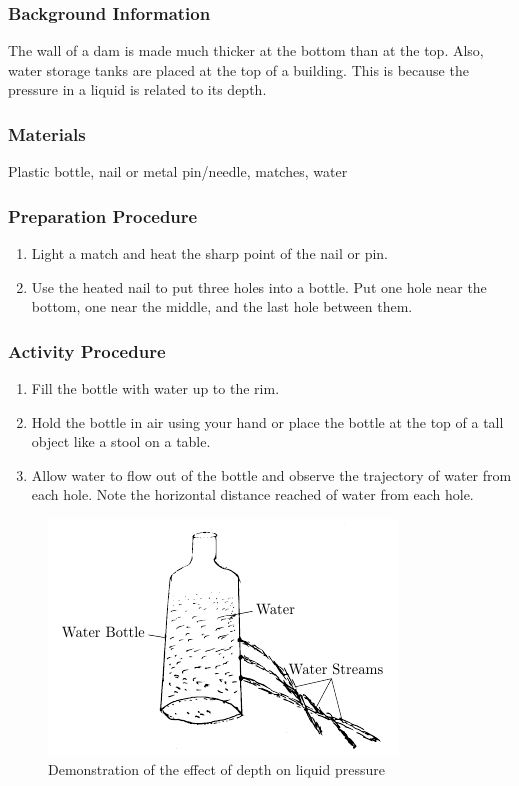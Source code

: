 \subsubsection*{Background Information}
The wall of a dam is made much thicker at the bottom than at the top. Also, water storage tanks are placed at the top of a building. This is because the pressure in a liquid is related to its depth.

\subsubsection*{Materials}
Plastic bottle, nail or metal pin/needle, matches, water


\subsubsection*{Preparation Procedure}
\begin{enumerate}
\item{Light a match and heat the sharp point of the nail or pin.} 
\item{Use the heated nail to put three holes into a bottle. Put one hole near the bottom, one near the middle, and the last hole between them.} 
\end{enumerate}

\subsubsection*{Activity Procedure}
\begin{enumerate}
\item{Fill the bottle with water up to the rim.} 
\item{Hold the bottle in air using your hand or place the bottle at the top of a tall object like a stool on a table.} 
\item{Allow water to flow out of the bottle and observe the trajectory of water from each hole. Note the horizontal distance reached of water from each hole.} 
\end{enumerate}

\begin{figure}
\begin{center}
\includegraphics{./img/pressure-liquid.png}
\caption{Demonstration of the effect of depth on liquid pressure}
\label{fig:pressure-liquid}
\end{center}
\end{figure}

